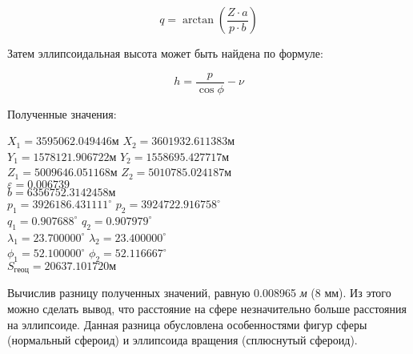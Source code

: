 \documentclass[a4paper,14pt]{article}
\newcommand\indent[1][1cm]{\hspace*{#1}}
\begin{document}
\begin{equation}
    q = \arctan \left(\frac{Z \cdot a}{p \cdot b} \right)
\end{equation}

\indent Затем эллипсоидальная высота может быть найдена по формуле:

\begin{equation}
    h = \frac{p}{\cos{\phi}} - \nu
\end{equation}

\indent Полученные значения:

\begin{center}
     $X_1 = 3595062.049446 \textit{м}$ $ X_2 = 3601932.611383 \textit{м}$\\
     $Y_1 = 1578121.906722 \textit{м}$ $Y_2 = 1558695.427717 \textit{м}$ \\ 
     $Z_1 = 5009646.051168 \textit{м}$ $Z_2 = 5010785.024187 \textit{м}$\\
     
     $\varepsilon = 0.006739$\\
     $b = 6356752.3142458 \textit{м}$\\
     $p_1 = 3926186.431111^\circ$ $p_2 = 3924722.916758^\circ$\\
     $q_1 = 0.907688^\circ$ $q_2 = 0.907979^\circ$\\
     $\lambda_1 = 23.700000^\circ$ $\lambda_2 = 23.400000^\circ$\\
     $\phi_1 = 52.100000^\circ$ $\phi_2 = 52.116667^\circ$\\
     $S_\textit{геоц} = 20637.101720 \textit{м}$
\end{center}

\indent Вычислив разницу полученных значений, равную 0.008965 \textit{м} (8 мм). Из этого можно сделать вывод, что расстояние на сфере незначительно больше расстояния на эллипсоиде. Данная разница обусловлена особенностями фигур сферы (нормальный сфероид) и эллипсоида вращения (сплюснутый сфероид).
\end{document}
